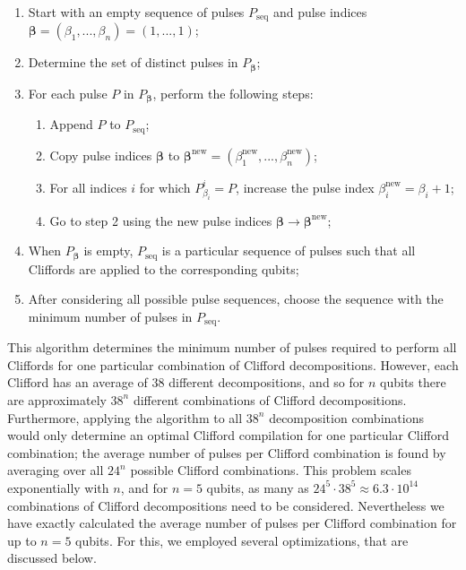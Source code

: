     \begin{enumerate}
      \item Start with an empty sequence of pulses $P_\text{seq}$ and pulse indices $\bm{\beta} = \left(\beta_1, ..., \beta_n\right) = \left(1, ..., 1\right)$;
      \item Determine the set of distinct pulses in $P_{\bm{\beta}}$;
      \item For each pulse $P$ in $P_{\bm{\beta}}$, perform the following steps:
      \begin{enumerate}
        \item Append $P$ to $P_\text{seq}$;
        \item Copy pulse indices $\bm{\beta}$ to $\bm{\beta}^\text{new}=\left(\beta_1^\text{new}, ..., \beta_n^\text{new}\right)$;
        \item For all indices $i$ for which $P_{\beta_i}^i=P$, increase the pulse index $\beta_i^\text{new} = \beta_i+1$;
        \item Go to step 2 using the new pulse indices $\bm{\beta} \rightarrow \bm{\beta}^\text{new}$;
      \end{enumerate}
      \item When $P_{\bm{\beta}}$ is empty, $P_\text{seq}$ is a particular sequence of pulses such that all Cliffords are applied to the corresponding qubits;
      \item After considering all possible pulse sequences, choose the sequence with the minimum number of pulses in $P_\text{seq}$.
    \end{enumerate}

    This algorithm determines the minimum number of pulses required to perform all Cliffords for one particular combination of Clifford decompositions. However, each Clifford has an average of $38$ different decompositions, and so for $n$ qubits there are approximately $38^n$ different combinations of Clifford decompositions. Furthermore, applying the algorithm to all $38^n$ decomposition combinations would only determine an optimal Clifford compilation for one particular Clifford combination; the average number of pulses per Clifford combination is found by averaging over all $24^n$ possible Clifford combinations. This problem scales exponentially with $n$, and for $n=5$ qubits, as many as $24^5\cdot38^5 \approx 6.3\cdot10^{14}$ combinations of Clifford decompositions need to be considered. Nevertheless we have exactly calculated the average number of pulses per Clifford combination for up to $n=5$ qubits. For this, we employed several optimizations, that are discussed below.

